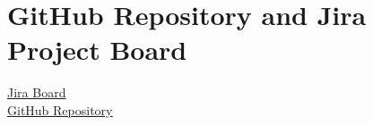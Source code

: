 \section{GitHub Repository and Jira Project Board}

\href{https://unixusergroup.atlassian.net/jira/software/projects/SCRUM/boards/1}{\underline{Jira Board}}\\
\href{https://github.com/Linux-Tech-Tips/swe_2}{\underline{GitHub Repository}}\\
